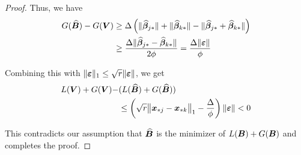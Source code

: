 \begin{proof}
Thus, we have 
\begin{align*}
  G(\widehat{\boldsymbol{B}})  - G(\boldsymbol{V}) & \geq \Delta \left( \|\widehat {\boldsymbol{\beta}}_{j {\ast}}\| + \| \widehat {\boldsymbol{\beta}}_{k {\ast}}\| -  \|\widehat {\boldsymbol{\beta}}_{j {\ast}} + \widehat {\boldsymbol{\beta}}_{k {\ast}}\| \right)  \\
  & \geq \frac{ \Delta \|\widehat {\boldsymbol{\beta}}_{j {\ast}} - \widehat {\boldsymbol{\beta}}_{k {\ast}} \|}{2\phi}
   = \frac{ \Delta \|\boldsymbol{\varepsilon}\|}{\phi} 
  \end{align*}
  
 Combining this with $\| \boldsymbol{\varepsilon} \|_1 \leq \sqrt{r} \| \boldsymbol{\varepsilon} \|$, we get
\begin{align*}
L(\boldsymbol{V}) + G(\boldsymbol{V}) - &( L(\widehat{\boldsymbol{B}}) + G(\widehat{\boldsymbol{B}}) ) \\
&\leq \left(\sqrt{r}\bigl\|{\bm x}_{{\ast} j}- {\bm x}_{{\ast} k}\bigr\|_1 -  \frac{\Delta}{\phi}\right) \|\boldsymbol{\varepsilon}\| <  0
\end{align*}

This contradicts our assumption that $\widehat{\boldsymbol{B}}$ is the minimizer of $L(\boldsymbol{B}) + G(\boldsymbol{B})$ and completes the proof.
\end{proof}
